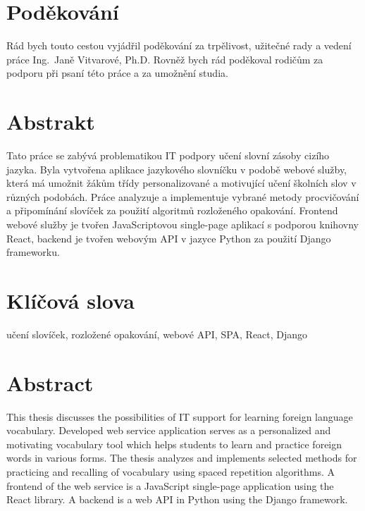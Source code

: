 \documentclass[a4paper,11pt,titlepage,fleqn]{article}
\begin{document}



\setcounter{page}{5}

\newpage
\thispagestyle{plain}
\section*{Poděkování}
Rád bych touto cestou vyjádřil poděkování za trpělivost, užitečné rady a vedení práce Ing.~Janě Vitvarové, Ph.D. Rovněž bych rád poděkoval rodičům za podporu při psaní této práce a za umožnění studia.
\thispagestyle{empty}

\newpage
\thispagestyle{plain}
\section*{Abstrakt}
Tato práce se zabývá problematikou IT podpory učení slovní zásoby cizího jazyka. Byla vytvořena aplikace jazykového slovníčku v podobě webové služby, která má umožnit žákům třídy personalizované a motivující učení školních slov v různých podobách. Práce analyzuje a implementuje vybrané metody procvičování a připomínání slovíček za použití algoritmů rozloženého opakování. Frontend webové služby je tvořen JavaScriptovou single-page aplikací s podporou knihovny React, backend je tvořen webovým API v jazyce Python za použití Django frameworku.


\section*{Klíčová slova}
učení slovíček, rozložené opakování, webové API, SPA, React, Django

\section*{Abstract}
This thesis discusses the possibilities of IT support for learning foreign language vocabulary. 
Developed web service application serves as a personalized and motivating vocabulary tool which helps students to learn and practice foreign words in various forms. The thesis analyzes and implements selected methods for practicing and recalling of vocabulary using spaced repetition algorithms. A frontend of the web service is a JavaScript single-page application using the React library. A backend is a web API in Python using the Django framework. 
\end{document}
